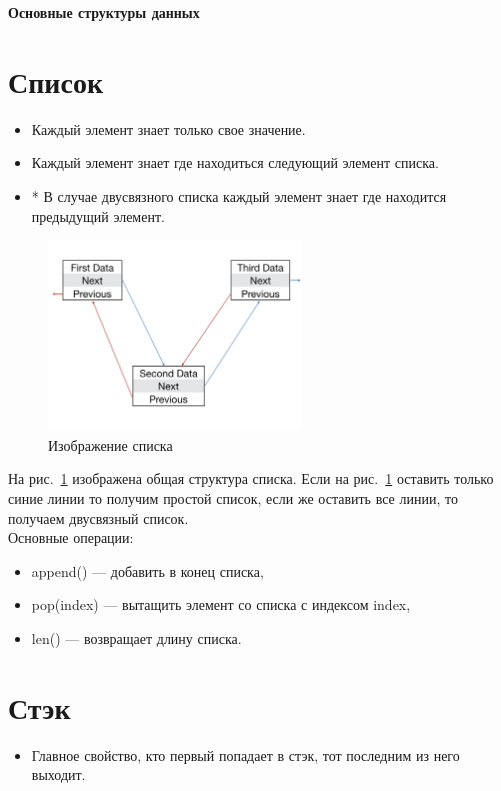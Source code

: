 \documentclass[12pt, twoside]{article}
\begin{document}
 

\begin{center}
{\LARGE\bf
Основные структуры данных
}
\end{center}

\section{Список}
\begin{itemize}
	\item Каждый элемент знает только свое значение.
	\item Каждый элемент знает где находиться следующий элемент списка.
	\item* В случае двусвязного списка каждый элемент знает где находится предыдущий элемент.
\end{itemize}

\begin{figure}[h!t]\center
\includegraphics[width=0.6\textwidth]{Lecture_4_List.jpg}
\caption{Изображение списка}
\label{Lecture_4_List}
\end{figure}

На рис.~\ref{Lecture_4_List} изображена общая структура списка. Если на рис.~\ref{Lecture_4_List} оставить только синие линии то получим простой список, если же оставить все линии, то получаем двусвязный список.\\

Основные операции:
\begin{itemize}
	\item append() --- добавить в конец списка,
	\item pop(index)  --- вытащить элемент со списка с индексом index,
	\item len() --- возвращает длину списка.
\end{itemize}

\section{Стэк}
\begin{itemize}
	\item Главное свойство, кто первый попадает в стэк, тот последним из него выходит.
\end{itemize}
\end{document}
